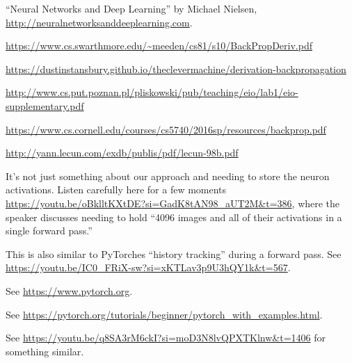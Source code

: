 \documentclass[12pt]{article}
\begin{document}
\begin{thebibliography}{99}

 ``Neural Networks and Deep Learning'' by Michael Nielsen, \url{http://neuralnetworksanddeeplearning.com}.

 \url{https://www.cs.swarthmore.edu/~meeden/cs81/s10/BackPropDeriv.pdf}

 \url{https://dustinstansbury.github.io/theclevermachine/derivation-backpropagation}

 \url{http://www.cs.put.poznan.pl/pliskowski/pub/teaching/eio/lab1/eio-supplementary.pdf}

 \url{https://www.cs.cornell.edu/courses/cs5740/2016sp/resources/backprop.pdf}

 \url{http://yann.lecun.com/exdb/publis/pdf/lecun-98b.pdf}

 It's not just something about our approach and needing to store the neuron activations.  Listen carefully here for a few moments \url{https://youtu.be/oBklltKXtDE?si=GadK8tAN98_aUT2M&t=386}, where the speaker discusses needing to hold ``4096 images and all of their activations in a single forward pass.''

 This is also similar to PyTorches ``history tracking'' during a forward pass.  See \url{https://youtu.be/IC0_FRiX-sw?si=xKTLav3p9U3hQY1k&t=567}.

 See \url{https://www.pytorch.org}.

 See \url{https://pytorch.org/tutorials/beginner/pytorch_with_examples.html}.

 See \url{https://youtu.be/q8SA3rM6ckI?si=moD3N8lvQPXTKlnw&t=1406} for something similar.

\end{thebibliography}
\end{document}
